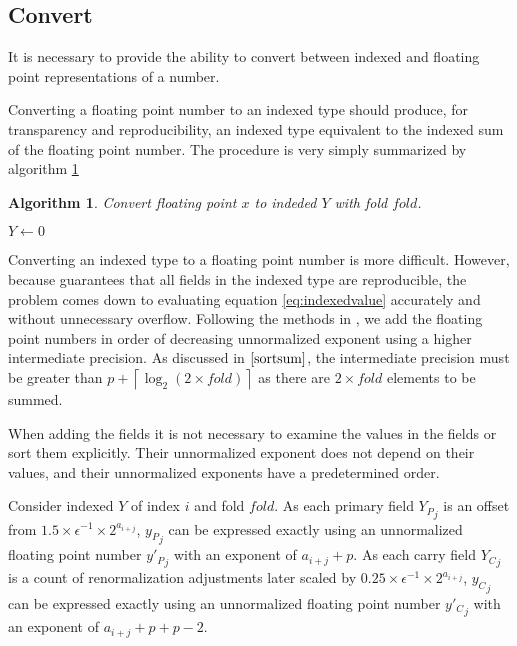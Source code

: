 \documentclass[12pt]{article}
\providecommand{\ceil}[1]{\left \lceil #1 \right \rceil }
\theoremstyle{plain}
\newtheorem{alg}{Algorithm}[section]
\begin{document}
  \subsection{Convert}
    \label{sec:convert}
    It is necessary to provide the ability to convert between indexed and floating point representations of a number.

    Converting a floating point number to an indexed type should produce, for transparency and reproducibility, an indexed type equivalent to the indexed sum of the floating point number.
    The procedure is very simply summarized by algorithm \ref{alg:conv2indexed}
    \begin{alg}
      Convert floating point $x$ to indeded $Y$ with fold $fold$.
      \begin{algorithmic}
          \State $Y \gets 0$
          \State {}
        \EndFunction
      \end{algorithmic}
      \label{alg:conv2indexed}
    \end{alg}

    Converting an indexed type to a floating point number is more difficult. However, because \cite{repsum} guarantees that all fields in the indexed type are reproducible, the problem comes down to evaluating equation \ref{eq:indexedvalue} accurately and without unnecessary overflow. Following the methods in \cite{sortsum}, we add the floating point numbers in order of decreasing unnormalized exponent using a higher intermediate precision. As discussed in $\cite{sortsum}$, the intermediate precision must be greater than $p + \ceil{\log_2(2 \times fold)}$ as there are $2 \times fold$ elements to be summed.

    When adding the fields it is not necessary to examine the values in the fields or sort them explicitly. Their unnormalized exponent does not depend on their values, and their unnormalized exponents have a predetermined order.

    Consider indexed $Y$ of index $i$ and fold $fold$.
    As each primary field ${Y_P}_j$ is an offset from $1.5 \times \epsilon^{-1} \times 2^{a_{i + j}}$, ${y_P}_j$ can be expressed exactly using an unnormalized floating point number ${y'_P}_j$ with an exponent of $a_{i + j} + p$.
    As each carry field ${Y_C}_j$ is a count of renormalization adjustments later scaled by $0.25 \times \epsilon^{-1} \times 2^{a_{i + j}}$, ${y_C}_j$ can be expressed exactly using an unnormalized floating point number ${y'_C}_j$ with an exponent of $a_{i + j} + p + p - 2$.
\end{document}
